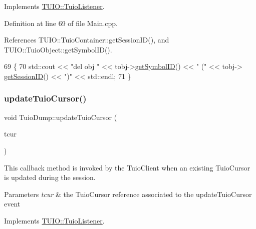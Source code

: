 Implements \hyperlink{class_t_u_i_o_1_1_tuio_listener_acf6d81485aaad7747cb399c325b831ee}{T\+U\+I\+O\+::\+Tuio\+Listener}.



Definition at line 69 of file Main.\+cpp.



References T\+U\+I\+O\+::\+Tuio\+Container\+::get\+Session\+I\+D(), and T\+U\+I\+O\+::\+Tuio\+Object\+::get\+Symbol\+I\+D().


\begin{DoxyCode}
69                                                 \{
70     std::cout << \textcolor{stringliteral}{"del obj "} << tobj->\hyperlink{class_t_u_i_o_1_1_tuio_object_a0d0b9b6e48c657350559acded6a1e53b}{getSymbolID}() << \textcolor{stringliteral}{" ("} << tobj->
      \hyperlink{class_t_u_i_o_1_1_tuio_container_a84c29bb63b233dbfd22811dab5b62833}{getSessionID}() << \textcolor{stringliteral}{")"} << std::endl;
71 \}
\end{DoxyCode}
\mbox{\label{class_tuio_dump_a6b54d0d57d714c5b51f5cf76a9b8b62a}} 
\subsubsection{\texorpdfstring{update\+Tuio\+Cursor()}{updateTuioCursor()}}
{\footnotesize\ttfamily void Tuio\+Dump\+::update\+Tuio\+Cursor (\begin{DoxyParamCaption}\item[{\hyperlink{class_t_u_i_o_1_1_tuio_cursor}{Tuio\+Cursor} $\ast$}]{tcur }\end{DoxyParamCaption})\hspace{0.3cm}{\ttfamily [virtual]}}

This callback method is invoked by the Tuio\+Client when an existing Tuio\+Cursor is updated during the session.


\begin{DoxyParams}{Parameters}
{\em tcur} & the Tuio\+Cursor reference associated to the update\+Tuio\+Cursor event \\
\hline
\end{DoxyParams}


Implements \hyperlink{class_t_u_i_o_1_1_tuio_listener_a1d60e2d80b0e09d74ded8713362c43c4}{T\+U\+I\+O\+::\+Tuio\+Listener}.



